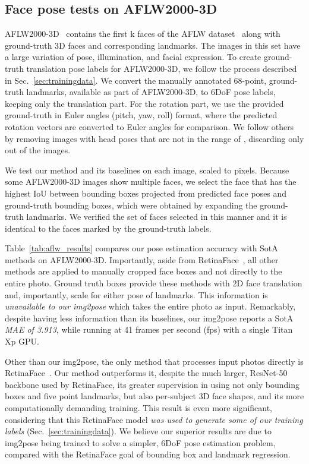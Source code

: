 \documentclass[final]{cvpr}
\newcommand{\minisection}[1]{\vspace{1mm}\noindent{\textbf{#1}.}}
\begin{document}
\subsection{Face pose tests on AFLW2000-3D}\label{sec:AFLW2000}
AFLW2000-3D~\cite{3ddfa} contains the first k faces of the AFLW dataset~\cite{aflw} along with ground-truth 3D faces and corresponding  landmarks. The images in this set have a large variation of pose, illumination, and facial expression. 
To create ground-truth translation pose labels for AFLW2000-3D, we follow the process described in Sec.~\ref{sec:trainingdata}. We convert the manually annotated 68-point, ground-truth landmarks, available as part of AFLW2000-3D, to 6DoF pose labels, keeping only the translation part.
For the rotation part, we use the provided ground-truth in Euler angles (pitch, yaw, roll) format, where the predicted rotation vectors are converted to Euler angles for comparison.
We follow others~\cite{hopenet, fsanet} by removing images with head poses that are not in the range of , discarding only  out of the  images.

We test our method and its baselines on each image, scaled to  pixels. Because some AFLW2000-3D images show multiple faces, we select the face that has the highest IoU between bounding boxes projected from predicted face poses and ground-truth bounding boxes, which were obtained by expanding the ground-truth landmarks. We verified the set of faces selected in this manner and it is identical to the faces marked by the ground-truth labels. 

\minisection{AFLW2000-3D face pose results} Table~\ref{tab:aflw_results} compares our pose estimation accuracy with SotA methods on AFLW2000-3D. Importantly, aside from RetinaFace~\cite{retinaface}, all other methods are applied to manually cropped face boxes and not directly to the entire photo. Ground truth boxes provide these methods with 2D face translation and, importantly, scale for either pose of landmarks. This information is {\em unavailable to our img2pose} which takes the entire photo as input. Remarkably, despite having less information than its baselines, our img2pose reports a SotA {\em MAE of 3.913}, while running at 41 frames per second (fps) with a single Titan Xp GPU.


Other than our img2pose, the only method that processes input photos directly is RetinaFace~\cite{retinaface}. Our method outperforms it, despite the much larger, ResNet-50 backbone used by RetinaFace, its greater supervision in using not only bounding boxes and five point landmarks, but also per-subject 3D face shapes, and its more computationally demanding training. This result is even more significant, considering that this RetinaFace model {\em was used to generate some of our training labels} (Sec.~\ref{sec:trainingdata}). We believe our superior results are due to img2pose being trained to solve a simpler, 6DoF pose estimation problem, compared with the RetinaFace goal of bounding box and landmark regression. 
\end{document}
